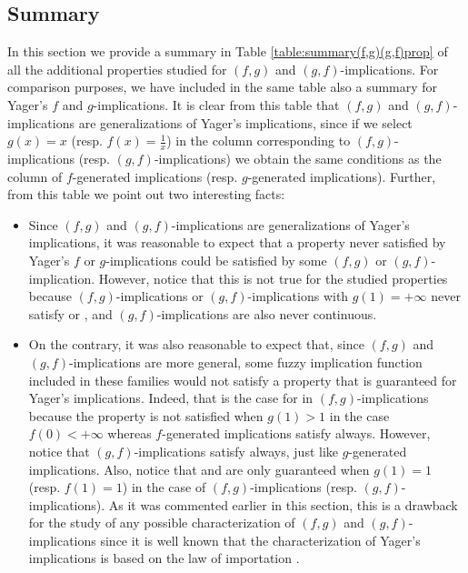 \subsection{Summary}
In this section we provide a summary in Table \ref{table:summary(f,g)(g,f)prop} of all the additional properties studied for $(f,g)$ and $(g,f)$-implications. For comparison purposes, we have included in the same table also a summary for Yager's $f$ and $g$-implications. It is clear from this table that $(f,g)$ and $(g,f)$-implications are generalizations of Yager's implications, since if we select $g(x)=x$ (resp. $f(x)=\frac{1}{x}$) in the column corresponding to $(f,g)$-implications (resp. $(g,f)$-implications) we obtain the same conditions as the column of  $f$-generated implications (resp. $g$-generated implications). Further, from this table we point out two interesting facts:
\begin{itemize}
	\item Since $(f,g)$ and $(g,f)$-implications are generalizations of Yager's implications, it was reasonable to expect that a property never satisfied by Yager's $f$ or $g$-implications could be satisfied by some $(f,g)$ or $(g,f)$-implication. However, notice that this is not true for the studied properties because  $(f,g)$-implications or $(g,f)$-implications with $g(1)=+\infty$ never satisfy \IP or \OP,  and $(g,f)$-implications are also never continuous.
	\item On the contrary, it was also reasonable to expect that, since $(f,g)$ and $(g,f)$-implications are more general, some fuzzy implication function included in these families would not satisfy a property that is guaranteed for Yager's implications. Indeed, that is the case for \EP in $(f,g)$-implications because the property is not satisfied when $g(1)>1$ in the case $f(0)<+\infty$ whereas $f$-generated implications satisfy \EP always. However, notice that $(g,f)$-implications satisfy \EP always, just like $g$-generated implications. Also, notice that \NP and \LI are only guaranteed when $g(1)=1$ (resp. $f(1)=1$) in the case of $(f,g)$-implications (resp. $(g,f)$-implications). As it was commented earlier in this section, this is a drawback for the study of any possible characterization of $(f,g)$ and $(g,f)$-implications since it is well known that the characterization of Yager's implications is based on the law of importation \cite{Massanet2012B}.
\end{itemize}

